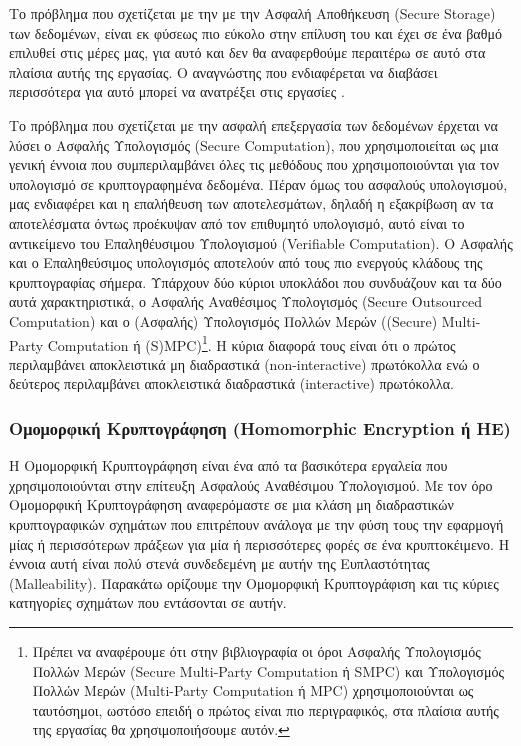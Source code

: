 Το πρόβλημα που σχετίζεται με την με την Ασφαλή Αποθήκευση (Secure Storage) των δεδομένων, είναι εκ φύσεως πιο εύκολο στην επίλυση του και έχει σε ένα βαθμό επιλυθεί στις μέρες μας, για αυτό και δεν θα αναφερθούμε περαιτέρω σε αυτό στα πλαίσια αυτής της εργασίας. Ο αναγνώστης που ενδιαφέρεται να διαβάσει περισσότερα για αυτό μπορεί να ανατρέξει στις εργασίες \cite{10.1145/1315245.1315318} \cite{DBLP:journals/access/Gupta0LB22}. 

Το πρόβλημα που σχετίζεται με την ασφαλή επεξεργασία των δεδομένων έρχεται να λύσει ο Ασφαλής Υπολογισμός (Secure Computation), που χρησιμοποιείται ως μια γενική έννοια που συμπεριλαμβάνει όλες τις μεθόδους που χρησιμοποιούνται για τον υπολογισμό σε κρυπτογραφημένα δεδομένα. Πέραν όμως του ασφαλούς υπολογισμού, μας ενδιαφέρει και η επαλήθευση των αποτελεσμάτων, δηλαδή η εξακρίβωση αν τα αποτελέσματα όντως προέκυψαν από τον επιθυμητό υπολογισμό, αυτό είναι το αντικείμενο του Επαληθέυσιμου Υπολογισμού (Verifiable Computation). Ο Ασφαλής και ο Επαληθεύσιμος υπολογισμός αποτελούν από τους πιο ενεργούς κλάδους της κρυπτογραφίας σήμερα. Υπάρχουν δύο κύριοι υποκλάδοι που συνδυάζουν και τα δύο αυτά χαρακτηριστικά, ο Ασφαλής Αναθέσιμος Υπολογισμός (Secure Outsourced Computation) και ο (Ασφαλής) Υπολογισμός Πολλών Μερών ((Secure) Multi-Party Computation ή (S)MPC)\footnote{Πρέπει να αναφέρουμε ότι στην βιβλιογραφία οι όροι Ασφαλής Υπολογισμός Πολλών Μερών (Secure Multi-Party Computation ή  SMPC) και Υπολογισμός Πολλών Μερών (Multi-Party Computation ή MPC)  χρησιμοποιούνται ως ταυτόσημοι, ωστόσο επειδή ο πρώτος είναι πιο περιγραφικός, στα πλαίσια αυτής της εργασίας θα χρησιμοποιήσουμε αυτόν.}. Η κύρια διαφορά τους είναι ότι ο πρώτος περιλαμβάνει αποκλειστικά μη διαδραστικά (non-interactive) πρωτόκολλα ενώ ο δεύτερος περιλαμβάνει αποκλειστικά διαδραστικά (interactive) πρωτόκολλα.

\subsubsection{Ομομορφική Κρυπτογράφηση (Homomorphic Encryption ή HE)}
Η Ομομορφική Κρυπτογράφηση είναι ένα από τα βασικότερα εργαλεία που χρησιμοποιούνται στην επίτευξη Ασφαλούς Αναθέσιμου Υπολογισμού. Με τον όρο Ομομορφική Κρυπτογράφηση αναφερόμαστε σε μια κλάση μη διαδραστικών κρυπτογραφικών σχημάτων που επιτρέπουν ανάλογα με την φύση τους την εφαρμογή μίας ή περισσότερων πράξεων για μία ή περισσότερες φορές σε ένα κρυπτοκέιμενο. Η έννοια αυτή είναι πολύ στενά συνδεδεμένη με αυτήν της Ευπλαστότητας (Malleability). Παρακάτω ορίζουμε την Ομομορφική Κρυπτογράφιση και τις κύριες κατηγορίες σχημάτων που εντάσονται σε αυτήν.

